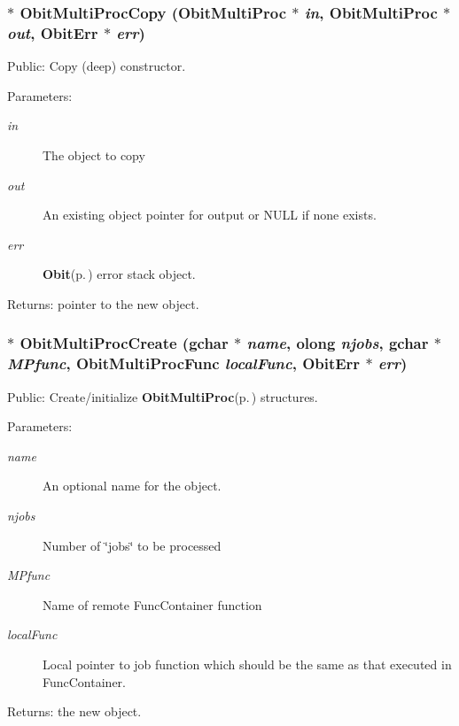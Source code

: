 \subsubsection{$\ast$ Obit\-Multi\-Proc\-Copy ({\bf Obit\-Multi\-Proc} $\ast$ {\em in}, {\bf Obit\-Multi\-Proc} $\ast$ {\em out}, {\bf Obit\-Err} $\ast$ {\em err})}\label{ObitMultiProc_8c_a13}


Public: Copy (deep) constructor. 

\begin{Desc}
\item[Parameters:]
\begin{description}
\item[{\em in}]The object to copy \item[{\em out}]An existing object pointer for output or NULL if none exists. \item[{\em err}]{\bf Obit}{\rm (p.\,\pageref{structObit})} error stack object. \end{description}
\end{Desc}
\begin{Desc}
\item[Returns:]pointer to the new object. \end{Desc}
\subsubsection{$\ast$ Obit\-Multi\-Proc\-Create (gchar $\ast$ {\em name}, {\bf olong} {\em njobs}, gchar $\ast$ {\em MPfunc}, {\bf Obit\-Multi\-Proc\-Func} {\em local\-Func}, {\bf Obit\-Err} $\ast$ {\em err})}\label{ObitMultiProc_8c_a15}


Public: Create/initialize {\bf Obit\-Multi\-Proc}{\rm (p.\,\pageref{structObitMultiProc})} structures. 

\begin{Desc}
\item[Parameters:]
\begin{description}
\item[{\em name}]An optional name for the object. \item[{\em njobs}]Number of \char`\"{}jobs\char`\"{} to be processed \item[{\em MPfunc}]Name of remote Func\-Container function \item[{\em local\-Func}]Local pointer to job function which should be the same as that executed in Func\-Container. \end{description}
\end{Desc}
\begin{Desc}
\item[Returns:]the new object. \end{Desc}
